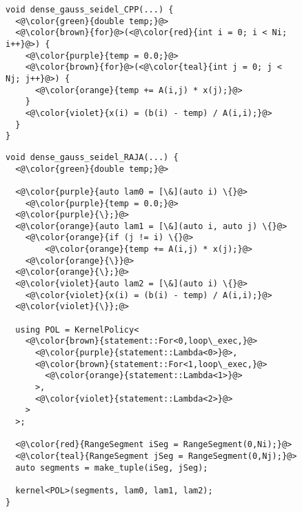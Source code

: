 \begin{figure*}

  \begin{subfigure}{0.48\columnwidth}
\begin{lstlisting}[caption={C++ reference implementation of dense Gauss-Seidel iterative solve loop nest.}]
void dense_gauss_seidel_CPP(...) {
  <@\color{green}{double temp;}@>
  <@\color{brown}{for}@>(<@\color{red}{int i = 0; i < Ni; i++}@>) {
    <@\color{purple}{temp = 0.0;}@>
    <@\color{brown}{for}@>(<@\color{teal}{int j = 0; j < Nj; j++}@>) {
      <@\color{orange}{temp += A(i,j) * x(j);}@>
    }
    <@\color{violet}{x(i) = (b(i) - temp) / A(i,i);}@>
  }
}
\end{lstlisting}
  \end{subfigure}
  \hspace{0.02\columnwidth}
  \begin{subfigure}{0.48\columnwidth}
\begin{lstlisting}[caption={RAJA reference implementation of dense Gauss-Seidel iterative solve.}]
void dense_gauss_seidel_RAJA(...) {
  <@\color{green}{double temp;}@>

  <@\color{purple}{auto lam0 = [\&](auto i) \{}@>
    <@\color{purple}{temp = 0.0;}@>
  <@\color{purple}{\};}@>
  <@\color{orange}{auto lam1 = [\&](auto i, auto j) \{}@>
    <@\color{orange}{if (j != i) \{}@>
        <@\color{orange}{temp += A(i,j) * x(j);}@>
    <@\color{orange}{\}}@>
  <@\color{orange}{\};}@>
  <@\color{violet}{auto lam2 = [\&](auto i) \{}@>
    <@\color{violet}{x(i) = (b(i) - temp) / A(i,i);}@>
  <@\color{violet}{\}};@>

  using POL = KernelPolicy<
    <@\color{brown}{statement::For<0,loop\_exec,}@>
      <@\color{purple}{statement::Lambda<0>}@>,
      <@\color{brown}{statement::For<1,loop\_exec,}@>
        <@\color{orange}{statement::Lambda<1>}@>
      >,
      <@\color{violet}{statement::Lambda<2>}@>
    >
  >;
  
  <@\color{red}{RangeSegment iSeg = RangeSegment(0,Ni);}@>
  <@\color{teal}{RangeSegment jSeg = RangeSegment(0,Nj);}@>
  auto segments = make_tuple(iSeg, jSeg);

  kernel<POL>(segments, lam0, lam1, lam2);
}

\end{lstlisting}

  \end{subfigure}
\caption{Comparison of C++ and RAJA implementations of dense Gauss-Seidel iterative solve. Text color links parts of each listing with similar function. The RAJA implementation is longer due to the decoupling of the different components of the computation.}\label{DenseDenseComparison}
\end{figure*}


